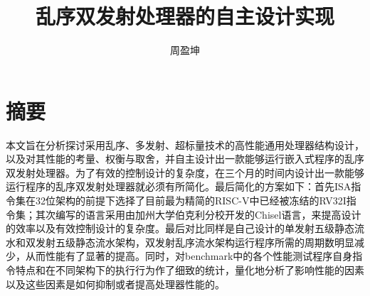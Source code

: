 \confidential{}%
\title{乱序双发射处理器的自主设计实现}%
\author{周盈坤}%
\advisorsec{}%
\maketitle%
\makeenglishtitle%
\makedeclaration%
\chapter*{摘\quad 要}%
\setcounter{page}{1}%
本文旨在分析探讨采用乱序、多发射、超标量技术的高性能通用处理器结构设计，以及对其性能的考量、权衡与取舍，并自主设计出一款能够运行嵌入式程序的乱序双发射处理器。为了有效的控制设计的复杂度，在三个月的时间内设计出一款能够运行程序的乱序双发射处理器就必须有所简化。最后简化的方案如下：首先ISA指令集在32位架构的前提下选择了目前最为精简的RISC-V中已经被冻结的RV32I指令集；其次编写的语言采用由加州大学伯克利分校开发的Chisel语言，来提高设计的效率以及有效控制设计的复杂度。最后对比同样是自己设计的单发射五级静态流水和双发射五级静态流水架构，双发射乱序流水架构运行程序所需的周期数明显减少，从而性能有了显著的提高。同时，对benchmark中的各个性能测试程序自身指令特点和在不同架构下的执行行为作了细致的统计，量化地分析了影响性能的因素以及这些因素是如何抑制或者提高处理器性能的。
